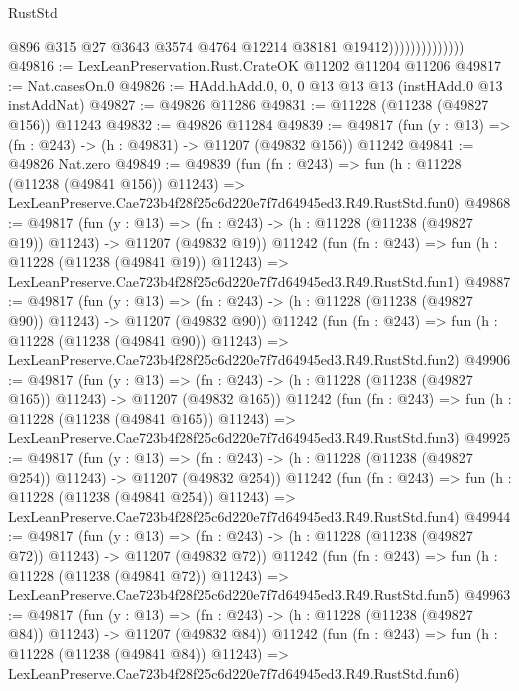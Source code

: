 \begin{lexlean}{RustStd}
\begin{coremodule}
                                @896
                                @315
                                @27
                                @3643
                                @3574
                                @4764
                                @12214
                                @38181
                                @19412))))))))))))))
@49816 := LexLeanPreservation.Rust.CrateOK @11202 @11204 @11206
@49817 := Nat.casesOn.{0}
@49826 := HAdd.hAdd.{0, 0, 0} @13 @13 @13 (instHAdd.{0} @13 instAddNat)
@49827 := @49826 @11286
@49831 := @11228 (@11238 (@49827 @156)) @11243
@49832 := @49826 @11284
@49839 := @49817 (fun (y : @13) => (fn : @243) -> (h : @49831) -> @11207 (@49832 @156)) @11242
@49841 := @49826 Nat.zero
@49849 := @49839
    (fun (fn : @243) =>
    fun (h : @11228 (@11238 (@49841 @156)) @11243) =>
    LexLeanPreserve.Cae723b4f28f25c6d220e7f7d64945ed3.R49.RustStd.fun0)
@49868 := @49817
    (fun (y : @13) =>
    (fn : @243) -> (h : @11228 (@11238 (@49827 @19)) @11243) -> @11207 (@49832 @19))
    @11242
    (fun (fn : @243) =>
    fun (h : @11228 (@11238 (@49841 @19)) @11243) =>
    LexLeanPreserve.Cae723b4f28f25c6d220e7f7d64945ed3.R49.RustStd.fun1)
@49887 := @49817
    (fun (y : @13) =>
    (fn : @243) -> (h : @11228 (@11238 (@49827 @90)) @11243) -> @11207 (@49832 @90))
    @11242
    (fun (fn : @243) =>
    fun (h : @11228 (@11238 (@49841 @90)) @11243) =>
    LexLeanPreserve.Cae723b4f28f25c6d220e7f7d64945ed3.R49.RustStd.fun2)
@49906 := @49817
    (fun (y : @13) =>
    (fn : @243) -> (h : @11228 (@11238 (@49827 @165)) @11243) -> @11207 (@49832 @165))
    @11242
    (fun (fn : @243) =>
    fun (h : @11228 (@11238 (@49841 @165)) @11243) =>
    LexLeanPreserve.Cae723b4f28f25c6d220e7f7d64945ed3.R49.RustStd.fun3)
@49925 := @49817
    (fun (y : @13) =>
    (fn : @243) -> (h : @11228 (@11238 (@49827 @254)) @11243) -> @11207 (@49832 @254))
    @11242
    (fun (fn : @243) =>
    fun (h : @11228 (@11238 (@49841 @254)) @11243) =>
    LexLeanPreserve.Cae723b4f28f25c6d220e7f7d64945ed3.R49.RustStd.fun4)
@49944 := @49817
    (fun (y : @13) =>
    (fn : @243) -> (h : @11228 (@11238 (@49827 @72)) @11243) -> @11207 (@49832 @72))
    @11242
    (fun (fn : @243) =>
    fun (h : @11228 (@11238 (@49841 @72)) @11243) =>
    LexLeanPreserve.Cae723b4f28f25c6d220e7f7d64945ed3.R49.RustStd.fun5)
@49963 := @49817
    (fun (y : @13) =>
    (fn : @243) -> (h : @11228 (@11238 (@49827 @84)) @11243) -> @11207 (@49832 @84))
    @11242
    (fun (fn : @243) =>
    fun (h : @11228 (@11238 (@49841 @84)) @11243) =>
    LexLeanPreserve.Cae723b4f28f25c6d220e7f7d64945ed3.R49.RustStd.fun6)

\end{coremodule}
\end{lexlean}
